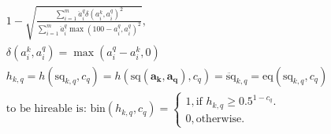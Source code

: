 \documentclass{article}
\begin{document}
\begin{gather}
    1 - 
    \sqrt{
        \frac{
            \sum_{i=1}^{m}{
                \ddot{a}_{i}^{q}
                \delta(
                    {a}_{i}^{k},
                    {a}_{i}^{q}
                ) ^ 2
            }
        }{
            \sum_{i=1}^{m}{
                \ddot{a}_{i}^{q}
                \max(
                    100 - {a}_{i}^{q}, 
                    {a}_{i}^{q}
                ) ^ 2
            }
        }
    },\\
    \delta({a}_{i}^{k}, {a}_{i}^{q}) = 
    \max({a}_{i}^{q} - {a}_{i}^{k}, 0)\\
    h_{k,q}
    = h(\text{sq}_{k,q},c_{q})
    = h(\text{sq}(\boldsymbol{a_k},\boldsymbol{a_q}),c_{q}) 
    = \ddot{\text{sq}}_{k,q}
    = \text{eq}\left(
        \text{sq}_{k,q},
        c_{q}
    \right)\\
    \text{to be hireable is: }
    \text{bin}(h_{k,q}, c_{q}) = 
    \begin{cases}
        1, \text{if } h_{k,q} \geq 0.5 ^ {1 - c_{q}}.\\
        0, \text{otherwise}.
    \end{cases}
\end{gather}
\end{document}
